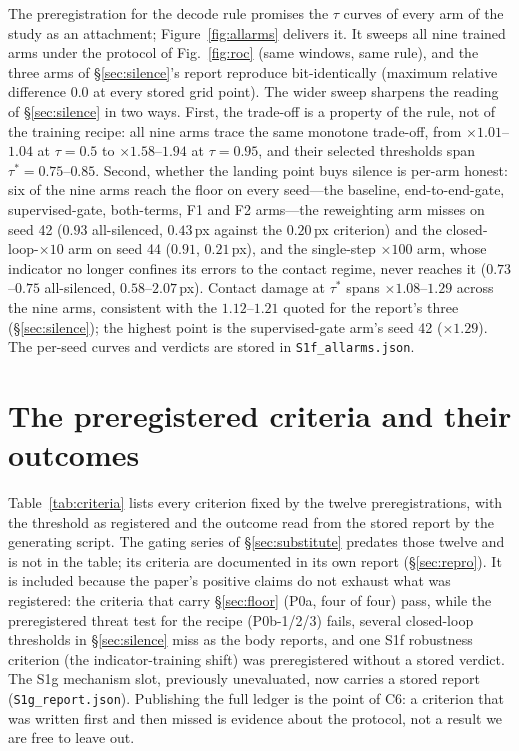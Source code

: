 \documentclass{article}
\begin{document}
The preregistration for the decode rule promises the $\tau$ curves of every arm
of the study as an attachment; Figure~\ref{fig:allarms} delivers it. It sweeps
all nine trained arms under the protocol of Fig.~\ref{fig:roc} (same windows,
same rule), and the three arms of \S\ref{sec:silence}'s report reproduce
bit-identically (maximum relative difference $0.0$ at every stored grid point).
The wider sweep sharpens the reading of \S\ref{sec:silence} in two ways. First,
the trade-off is a property of the rule, not of the training recipe: all nine
arms trace the same monotone trade-off, from $\times1.01$--$1.04$ at
$\tau{=}0.5$ to $\times1.58$--$1.94$ at $\tau{=}0.95$, and their
selected thresholds span $\tau^\ast = 0.75$--$0.85$. Second, whether the landing
point buys silence is per-arm honest: six of the nine arms reach the floor on
every seed---the baseline, end-to-end-gate, supervised-gate, both-terms, F1 and
F2 arms---the reweighting arm misses on seed 42 ($0.93$ all-silenced, $0.43$\,px
against the $0.20$\,px criterion) and the closed-loop-$\times10$ arm on seed 44
($0.91$, $0.21$\,px), and the single-step $\times100$ arm, whose indicator no
longer confines its errors to the contact regime, never reaches it
($0.73$--$0.75$ all-silenced, $0.58$--$2.07$\,px). Contact damage at
$\tau^\ast$ spans $\times1.08$--$1.29$ across the nine arms, consistent with the
$1.12$--$1.21$ quoted for the report's three (\S\ref{sec:silence}); the highest
point is the supervised-gate arm's seed 42 ($\times1.29$). The per-seed curves
and verdicts are stored in \texttt{S1f\_allarms.json}.

\section{The preregistered criteria and their outcomes}\label{app:criteria}
Table~\ref{tab:criteria} lists every criterion fixed by the twelve
preregistrations, with the threshold as registered and the outcome read
from the stored report by the generating script. The gating series of
\S\ref{sec:substitute} predates those twelve and is not in the table; its
criteria are documented in its own report (\S\ref{sec:repro}). It is
included because the paper's positive claims do not exhaust what was
registered: the criteria that carry \S\ref{sec:floor} (P0a, four of four)
pass, while the preregistered threat test for the recipe (P0b-1/2/3) fails,
several closed-loop thresholds in \S\ref{sec:silence} miss as the body
reports, and one S1f robustness criterion (the indicator-training shift) was
preregistered without a stored verdict. The S1g mechanism slot, previously
unevaluated, now carries a stored report (\texttt{S1g\_report.json}).
Publishing the full ledger is the point of C6: a criterion that was
written first and then missed is evidence about the protocol, not a result
we are free to leave out.

\end{document}
